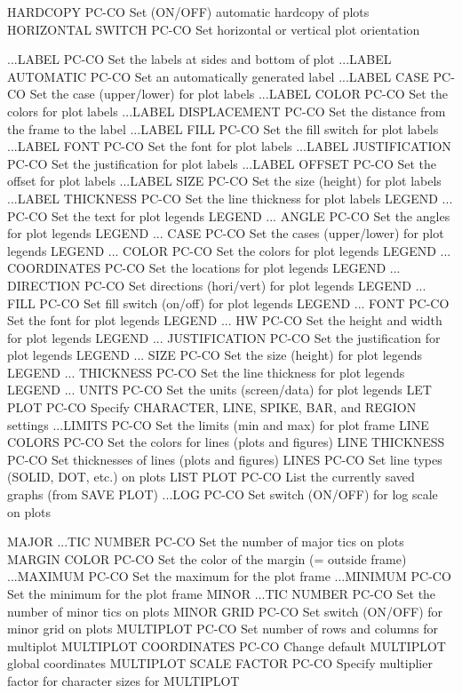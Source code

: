 HARDCOPY                    PC-CO Set (ON/OFF) automatic hardcopy of plots
HORIZONTAL SWITCH           PC-CO Set horizontal or vertical plot orientation

...LABEL                    PC-CO Set the labels at sides and bottom of plot
...LABEL AUTOMATIC          PC-CO Set an automatically generated label
...LABEL CASE               PC-CO Set the case (upper/lower) for plot labels
...LABEL COLOR              PC-CO Set the colors for plot labels
...LABEL DISPLACEMENT       PC-CO Set the distance from the frame to the label
...LABEL FILL               PC-CO Set the fill switch for plot labels
...LABEL FONT               PC-CO Set the font for plot labels
...LABEL JUSTIFICATION      PC-CO Set the justification for plot labels
...LABEL OFFSET             PC-CO Set the offset for plot labels
...LABEL SIZE               PC-CO Set the size (height) for plot labels
...LABEL THICKNESS          PC-CO Set the line thickness for plot labels
LEGEND ...                  PC-CO Set the text for plot legends
LEGEND ... ANGLE            PC-CO Set the angles for plot legends
LEGEND ... CASE             PC-CO Set the cases (upper/lower) for plot legends
LEGEND ... COLOR            PC-CO Set the colors for plot legends
LEGEND ... COORDINATES      PC-CO Set the locations for plot legends
LEGEND ... DIRECTION        PC-CO Set directions (hori/vert) for plot legends
LEGEND ... FILL             PC-CO Set fill switch (on/off) for plot legends
LEGEND ... FONT             PC-CO Set the font for plot legends
LEGEND ... HW               PC-CO Set the height and width for plot legends
LEGEND ... JUSTIFICATION    PC-CO Set the justification for plot legends
LEGEND ... SIZE             PC-CO Set the size (height) for plot legends
LEGEND ... THICKNESS        PC-CO Set the line thickness for plot legends
LEGEND ... UNITS            PC-CO Set the units (screen/data) for plot legends
LET PLOT                    PC-CO Specify CHARACTER, LINE, SPIKE, BAR, and REGION settings
...LIMITS                   PC-CO Set the limits (min and max) for plot frame
LINE COLORS                 PC-CO Set the colors for lines (plots and figures)
LINE THICKNESS              PC-CO Set thicknesses of lines (plots and figures)
LINES                       PC-CO Set line types (SOLID, DOT, etc.) on plots
LIST PLOT                   PC-CO List the currently saved graphs (from SAVE PLOT)
...LOG                      PC-CO Set switch (ON/OFF) for log scale on plots

MAJOR ...TIC NUMBER         PC-CO Set the number of major tics on plots
MARGIN COLOR                PC-CO Set the color of the margin (= outside frame)
...MAXIMUM                  PC-CO Set the maximum for the plot frame
...MINIMUM                  PC-CO Set the minimum for the plot frame
MINOR ...TIC NUMBER         PC-CO Set the number of minor tics on plots
MINOR GRID                  PC-CO Set switch (ON/OFF) for minor grid on plots
MULTIPLOT                   PC-CO Set number of rows and columns for multiplot
MULTIPLOT COORDINATES       PC-CO Change default MULTIPLOT global coordinates
MULTIPLOT SCALE FACTOR      PC-CO Specify multiplier factor for character sizes for MULTIPLOT

